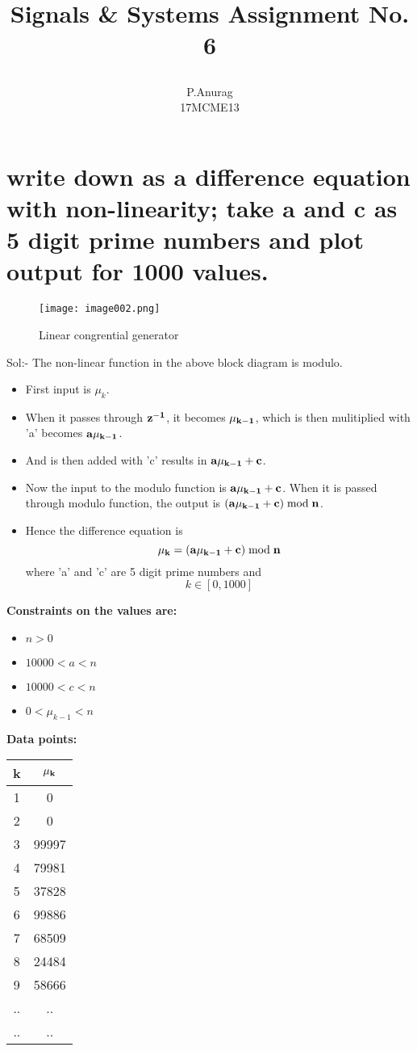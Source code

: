 \documentclass[a4paper,10pt]{article}
\title{
  \begin{large}
    Signals \& Systems
    Assignment No. 6
  \end{large}
}
\author{P.Anurag\\ 17MCME13}
\begin{document}
\maketitle

\section{ write down as a difference equation with non-linearity; take a and c as 5 digit prime numbers and plot output for 1000 values.}
  \begin{figure}[!hbt]
    \centering
      \texttt{[image: image002.png]}
    \caption{Linear congrential generator}
  \end{figure}

  \Large{Sol:- }
  The non-linear function in the above block diagram is modulo. 

\begin{itemize}
 \item First input is $\mu_k$.
 \item When it passes through \Large{$\bf{z^{-1}}$}, it becomes $\bf{\mu_{k-1}}$, which is then mulitiplied with 'a' becomes $\bf{a\mu_{k-1}}$.
 \item And is then added with 'c' results in $\bf{a\mu_{k-1}+c}$.
 \item Now the input to the modulo function is $\bf{a\mu_{k-1}+c}$. When it is passed through modulo function, the output is $\bf{(a\mu_{k-1}+c)\bmod n}$.
 \item Hence the difference equation is \[\bf{\mu_k = (a\mu_{k-1}+c)\bmod n}\] where 'a' and 'c' are 5 digit prime numbers and \[ k \in [0, 1000] \]
\end{itemize}

 \Large{\bf{Constraints on the values are: }}
\begin{itemize}
 \item $n > 0$
 \item $10000 < a < n$
 \item $10000 < c < n$
 \item $0 < \mu_{k-1} < n$
\end{itemize}

\Large{\bf{Data points:}}\\

\begin{center}
\begin{tabular}[!hbt]{| c | c |}
\hline
  \bf{k} & $\bf{\mu_k}$ \\
  \hline
 1 & 0\\ 
 2 & 0\\  
 3 & 99997 \\
 4 & 79981 \\
 5 & 37828 \\
 6 & 99886 \\
 7 & 68509 \\
 8 & 24484 \\
 9 & 58666 \\
 .. & .. \\
 .. & .. \\
 \hline
\end{tabular}
\end{center}
\end{document}
